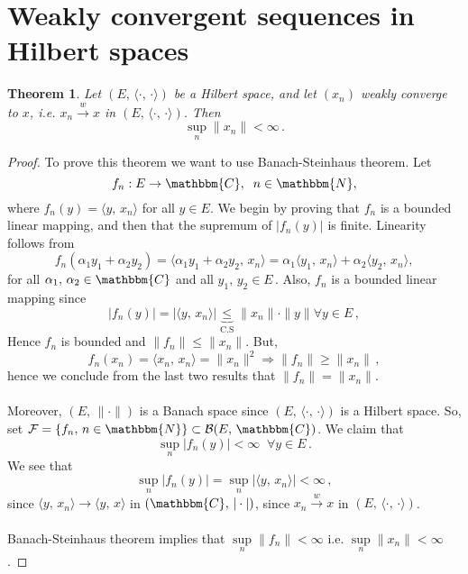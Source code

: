 \documentclass[12pt, a4paper]{article}
\newcommand{\N}{\ensuremath{\mathbbm{N}}}
\newcommand{\C}{\ensuremath{\mathbbm{C}}}
\newtheorem{theorem}{Theorem}[section]
\begin{document}
\section{Weakly convergent sequences in Hilbert spaces}
\begin{theorem}
Let $(E,\,\langle\cdot,\,\cdot\rangle)$ be a Hilbert space, and let $(x_n)$ weakly converge to $x$, i.e. $x_n\overset{w}{\to} x$  in $(E,\,\langle\cdot,\,\cdot\rangle)$. Then
\[
    \underset{n}{\operatorname{sup}}\|x_n\|<\infty\,.
\]
\end{theorem}
\begin{proof}
To prove this theorem we want to use Banach-Steinhaus theorem. Let
\begin{equation*}
f_n:E\to\C, \;\; n\in\N,
\end{equation*}
where $f_n(y)=\langle y,\,x_n\rangle$ for all $y\in E$. We begin by proving that $f_n$ is a bounded linear mapping, and then that the supremum of $|f_n(y)|$ is finite. Linearity follows from
\[
    f_n(\alpha_1y_1+\alpha_2y_2)=\langle\alpha_1y_1+\alpha_2y_2,\,x_n\rangle=\alpha_1\langle y_1,\,x_n\rangle+\alpha_2\langle y_2,\,x_n\rangle,
\]
for all $\alpha_1,\,\alpha_2\in\C$ and all $y_1,\,y_2\in E\,.$
Also, $f_n$ is a bounded linear mapping since
\[
    |f_n(y)|=|\langle y,\,x_n\rangle|\underbrace{\leq}_{\text{C.S}} \|x_n\|\cdot\|y\|\forall y \in E\,,
\]
Hence $f_n$ is bounded and $\|f_n\|\leq \|x_n\|$. But,
\[
    f_n(x_n)=\langle x_n,\,x_n\rangle=\|x_n\|^2\Rightarrow \|f_n\|\geq \|x_n\|\,,
\]
hence we conclude from the last two results that $\|f_n\|=\|x_n\|$. 
\\\\
Moreover, $(E,\,\|\cdot\|)$ is a Banach space since $(E,\,\langle\cdot,\,\cdot\rangle)$ is a Hilbert space. So, set $\mathcal{F}=\{f_n,\,n\in\N\}\subset\mathcal{B}(E,\,\C)$. We claim that
\[
    \underset{n}{\operatorname{sup}}|f_n(y)|<\infty\;\;\forall y\in E\,.
\]
We see that
\[
     \underset{n}{\operatorname{sup}}|f_n(y)|= \underset{n}{\operatorname{sup}}|\langle y,\,x_n\rangle|<\infty\,,
\]
since $\langle y,\,x_n\rangle\to\langle y,\,x\rangle$ in $(\C,\,|\cdot|)$, since $x_n\overset{w}{\to}x$ in $(E,\,\langle\cdot,\,\cdot\rangle)$.
\\\\
Banach-Steinhaus theorem implies that $ \underset{n}{\operatorname{sup}}\|f_n\|<\infty$ i.e. $ \underset{n}{\operatorname{sup}}\|x_n\|<\infty$.
\end{proof}
\end{document}
